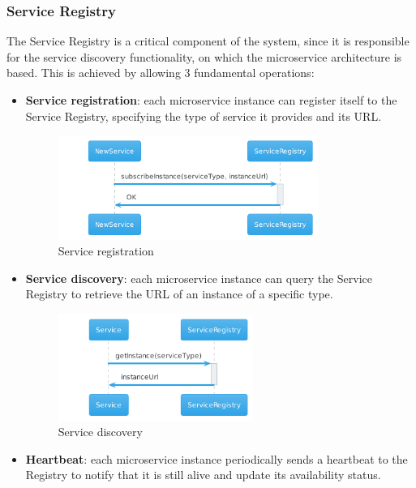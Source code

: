 \subsubsection{Service Registry}
The Service Registry is a critical component of the system, since it is responsible for the service discovery functionality, on which the microservice architecture is based. This is achieved by allowing 3 fundamental operations:
\begin{itemize}
    \item \textbf{Service registration}: each microservice instance can register itself to the Service Registry, specifying the type of service it provides and its URL.
    \begin{figure}[H]
        \centering
        \includegraphics[width=0.8\textwidth]{Diagrams/sequence/service_registration.png}
        \caption{Service registration}
    \end{figure}
    \item \textbf{Service discovery}: each microservice instance can query the Service Registry to retrieve the URL of an instance of a specific type.
    \begin{figure}[H]
        \hspace{2cm}
        \includegraphics[width=0.6\textwidth]{Diagrams/sequence/service_discovery.png}
        \caption{Service discovery}
    \end{figure}
    \item \textbf{Heartbeat}: each microservice instance periodically sends a heartbeat to the Registry to notify that it is still alive and update its availability status.
    \begin{figure}[H]

\end{figure}
\end{itemize}
